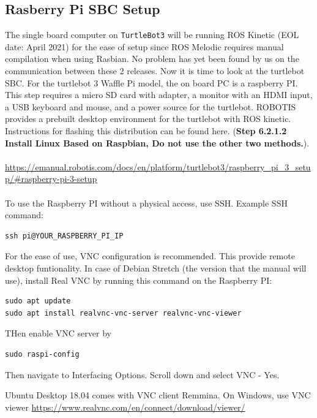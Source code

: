 \documentclass[12]{article}
\begin{document}
\subsection{Rasberry Pi SBC Setup}
The single board computer on \texttt{TurtleBot3} will be running ROS Kinetic (EOL date: April 2021) for the ease of setup since ROS Melodic requires manual compilation when using Rasbian. 
No problem has yet been found by us on the communication between these 2 releases.
Now it is time to look at the turtlebot SBC. For the turtlebot 3 Waffle Pi model, the on board PC is a raspberry PI. 
This step requires a micro SD card with adapter, a monitor with an HDMI input, a USB keyboard and mouse, and a power source for the turtlebot. 
ROBOTIS provides a prebuilt desktop environment for the turtlebot with ROS kinetic. Instructions for flashing this distribution can be found here. (\textbf{Step 6.2.1.2 Install Linux Based on Raspbian, Do not use the other two methods.}).\\\\
\url {https://emanual.robotis.com/docs/en/platform/turtlebot3/raspberry_pi_3_setup/#raspberry-pi-3-setup}\\\\
To use the Raspberry PI without a physical access, use SSH. Example SSH command:
\begin{lstlisting}[style=bash]
ssh pi@YOUR_RASPBERRY_PI_IP
\end{lstlisting}
For the ease of use, VNC configuration is recommended. This provide remote desktop funtionality. In case of Debian Stretch (the version that the manual will use), install Real VNC by running this command on the Raspberry PI:
\begin{lstlisting}[style=bash]
sudo apt update
sudo apt install realvnc-vnc-server realvnc-vnc-viewer
\end{lstlisting}
THen enable VNC server by 
\begin{lstlisting}[style=bash]
sudo raspi-config
\end{lstlisting}
Then navigate to Interfacing Options.
Scroll down and select VNC - Yes.


Ubuntu Desktop 18.04 comes with VNC client Remmina.
On Windows, use VNC viewer
\url{https://www.realvnc.com/en/connect/download/viewer/}
\end{document}
